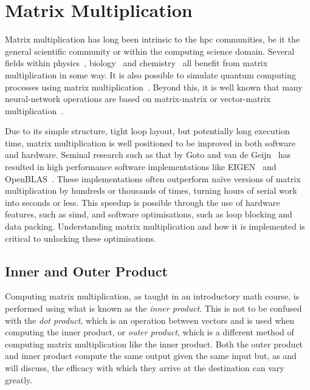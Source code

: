 \documentclass[\main/thesis.tex]{subfiles}
\begin{document}
\chapter{Matrix Multiplication}
\label{cha:matmul}
Matrix multiplication has long been intrinsic to the \gls{hpc} communities, be it the general scientific community or within the computing science domain.
Several fields within physics~\autocite{krol2014matrix}, biology~\autocite{akutsu2000algorithms} and chemistry~\autocite{weber2015semiempirical} all benefit from matrix multiplication in some way.
It is also possible to simulate quantum computing processes using matrix multiplication~\autocite{zulehner2019matrix}.
Beyond this, it is well known that many neural-network operations are based on matrix-matrix or vector-matrix multiplication~\autocite{rojas1996neural,blue1992training}.

Due to its simple structure, tight loop layout, but potentially long execution time, matrix multiplication is well positioned to be improved in both software and hardware.
Seminal research such as that by Goto and van de Geijn~\autocite{goto2008anatomy} has resulted in high performance software implementations like EIGEN~\autocite{guennebaud2021eigen} and OpenBLAS~\autocite{xianyi2012model}.
These implementations often outperform na\"ive versions of matrix multiplication by hundreds or thousands of times, turning hours of serial work into seconds or less.
This speedup is possible through the use of hardware features, such as \gls{simd}, and software optimisations, such as loop blocking and data packing.
Understanding matrix multiplication and how it is implemented is critical to unlocking these optimisations.

\section{Inner and Outer Product}
\label{sec:products}
Computing matrix multiplication, as taught in an introductory math course, is performed using what is known as the \emph{inner product}.
This is not to be confused with the \emph{dot product}, which is an operation between vectors and is used when computing the inner product, or \emph{outer product}, which is a different method of computing matrix multiplication like the inner product.
Both the outer product and inner product compute the same output given the same input but, as  and  will discuss, the efficacy with which they arrive at the destination can vary greatly.
\end{document}
